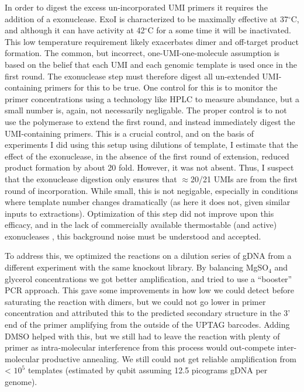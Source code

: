 In order to digest the
excess un-incorporated UMI primers it requires the addition of a
exonuclease. ExoI is characterized to be maximally effective at
37\(^{\circ}\)C, and although it can have activity at 42\(^{\circ}\)C
for a some time \parencite{fei2015structural} it
will be inactivated. This low temperature requirement likely exacerbates
dimer and off-target product formation.
The common, but incorrect, one-UMI-one-molecule assumption is based on
the belief that each UMI and each genomic template is used once in the
first round. The exonuclease step must therefore digest all
un-extended UMI-containing primers for this to be true. One control
for this is to monitor the primer concentrations using a technology
like HPLC to measure abundance, but a small number is, again, not
necessarily negligable. The proper control is to not use the
polymerase to extend the first round, and instead immediately digest
the UMI-containing primers. This is a crucial control, and on the
basis of experiments I did using this setup using dilutions of
template, I estimate that the effect of the exonuclease, in the 
absence of the first round of extension, reduced product formation 
by about 20 fold. However, it was not absent. Thus, I suspect that 
the exonuclease digestion only ensures that $\approx$20/21 UMIs are
from the first round of incorporation. While small, this is not
negigable, especially in conditions where template number changes
dramatically (as here it does not, given similar inputs to extractions).
Optimization of this step did not improve upon this efficacy, and in
the lack of commercially available thermostable (and active) 
exonucleases \parencite{fei2015structural}, this background noise 
must be understood and accepted.

To address this, we optimized the reactions on a dilution series of gDNA
from a different experiment with the same knockout library. By balancing
MgSO\(_4\) and glycerol concentrations we got better amplification, and
tried to use a ``booster'' \parencite{ruano1989biphasic} PCR approach. 
This gave some improvements in how low we
could detect before saturating the reaction with dimers, but we could
not go lower in primer concentration and attributed this to the
predicted secondary structure in the 3' end of the primer amplifying
from the outside of the UPTAG barcodes. Adding DMSO helped with this,
but we still had to leave the reaction with plenty of primer as
intra-molecular interference from this process would out-compete
inter-molecular productive annealing. We still could not get reliable
amplification from \textless{} \(10^5\) templates (estimated by qubit
assuming 12.5 picograms gDNA per genome).

